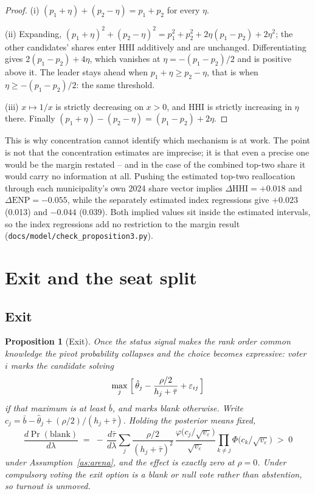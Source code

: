 \documentclass[11pt]{article}
\newtheorem{proposition}{Proposition}
\theoremstyle{definition}
\theoremstyle{remark}
\begin{document}
\begin{proof}
(i) $(p_1+\eta) + (p_2-\eta) = p_1 + p_2$ for every $\eta$.

(ii) Expanding, $(p_1+\eta)^2 + (p_2-\eta)^2
= p_1^2 + p_2^2 + 2\eta(p_1-p_2) + 2\eta^2$; the other candidates' shares
enter $\mathrm{HHI}$ additively and are unchanged. Differentiating gives
$2(p_1-p_2) + 4\eta$, which vanishes at $\eta = -(p_1-p_2)/2$ and is positive
above it. The leader stays ahead when $p_1 + \eta \ge p_2 - \eta$, that is when
$\eta \ge -(p_1-p_2)/2$: the same threshold.

(iii) $x \mapsto 1/x$ is strictly decreasing on $x > 0$, and $\mathrm{HHI}$ is
strictly increasing in $\eta$ there. Finally
$(p_1+\eta) - (p_2-\eta) = (p_1-p_2) + 2\eta$.
\end{proof}

This is why concentration cannot identify which mechanism is at work. The
point is not that the concentration estimates are imprecise; it is that even a
precise one would be the margin restated -- and in the case of the combined
top-two share it would carry no information at all. Pushing the estimated
top-two reallocation through each municipality's own 2024 share vector implies
$\Delta\mathrm{HHI} = +0.018$ and $\Delta\mathrm{ENP} = -0.055$, while the
separately estimated index regressions give $+0.023$ (0.013) and $-0.044$
(0.039). Both implied values sit inside the estimated intervals, so the index
regressions add no restriction to the margin result
(\texttt{docs/model/check\_proposition3.py}).

\section{Exit and the seat split}
\label{sec:seat}

\subsection{Exit}

\begin{proposition}[Exit]
\label{prop:exit}
Once the status signal makes the rank order common knowledge the pivot
probability collapses and the choice becomes expressive: voter $i$ marks the
candidate solving
\[
  \max_j \;\Bigl[\,\hat\theta_j - \frac{\rho/2}{h_j + \bar\tau}
    + \varepsilon_{ij}\,\Bigr]
\]
if that maximum is at least $\bar b$, and marks blank otherwise. Write
$c_j = \bar b - \hat\theta_j + (\rho/2)/(h_j+\bar\tau)$. Holding the posterior
means fixed,
\[
  \frac{d\Pr(\mathrm{blank})}{d\lambda}
  \;=\; -\,\frac{d\bar\tau}{d\lambda}
    \sum_j \frac{\rho/2}{(h_j+\bar\tau)^2}\,
    \frac{\varphi\bigl(c_j/\sqrt{v_\varepsilon}\bigr)}{\sqrt{v_\varepsilon}}
    \prod_{k \ne j}\Phi\bigl(c_k/\sqrt{v_\varepsilon}\bigr)
  \;>\; 0
\]
under Assumption~\ref{as:arena}, and the effect is exactly zero at $\rho = 0$.
Under compulsory voting the exit option is a blank or null vote rather than
abstention, so turnout is unmoved.
\end{proposition}
\end{document}
